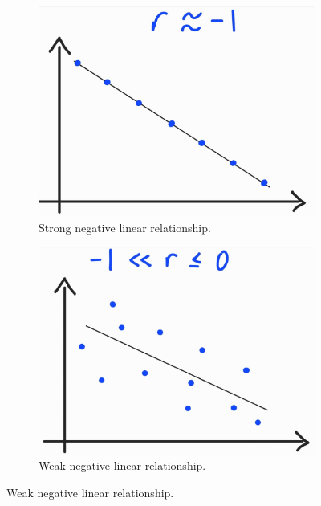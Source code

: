 \documentclass[../Notes.tex]{subfiles}
\begin{document}
\begin{figure}[htbp]
  \begin{subfigure}[c]{0.4\textwidth}
      \centering
      \includegraphics[width=\textwidth]{../images/product-moment-correlation-coefficient/r-is--neg-1.jpg}
      \caption{Strong negative linear relationship.}
  \end{subfigure}\hspace{0.06666666666667\textwidth}
  \begin{subfigure}[c]{0.4\textwidth}
      \centering
      \includegraphics[width=\textwidth]{../images/product-moment-correlation-coefficient/small-negative-r.jpg}
      \caption{Weak negative linear relationship.}
  \end{subfigure}


\end{figure}
\end{document}
